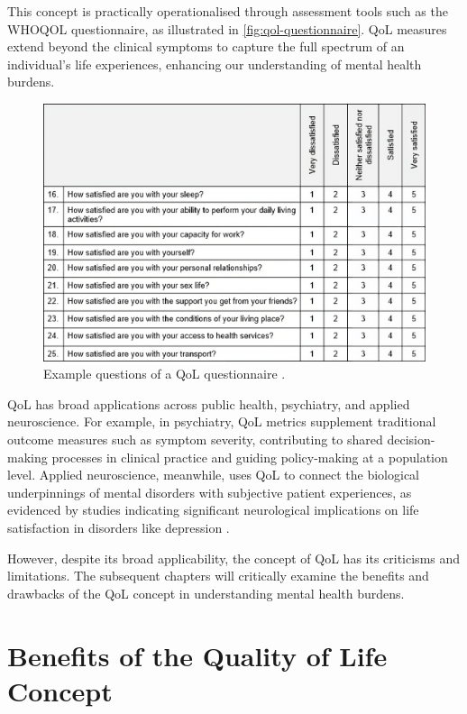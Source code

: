 \documentclass[10pt]{article}
\begin{document}
\begin{sloppypar}
  This concept is practically operationalised through assessment tools such as the WHOQOL questionnaire, as illustrated in \autoref{fig:qol-questionnaire}. QoL measures extend beyond the clinical symptoms to capture the full spectrum of an individual's life experiences, enhancing our understanding of mental health burdens.

  \begin{figure}[ht] \centering \includegraphics[width=\textwidth]{figures/qol-questionnaire.png} \caption[Example questions of a QoL questionnaire.]{Example questions of a QoL questionnaire \citep{harper_development_1998}.} \label{fig:qol-questionnaire} \end{figure}

  QoL has broad applications across public health, psychiatry, and applied neuroscience. For example, in psychiatry, QoL metrics supplement traditional outcome measures such as symptom severity, contributing to shared decision-making processes in clinical practice and guiding policy-making at a population level. Applied neuroscience, meanwhile, uses QoL to connect the biological underpinnings of mental disorders with subjective patient experiences, as evidenced by studies indicating significant neurological implications on life satisfaction in disorders like depression \citep{zhang_brain_2016}.

  However, despite its broad applicability, the concept of QoL has its criticisms and limitations. The subsequent chapters will critically examine the benefits and drawbacks of the QoL concept in understanding mental health burdens.

  \section{Benefits of the Quality of Life Concept}
  \label{sec:benefits}


\end{sloppypar}
\end{document}
